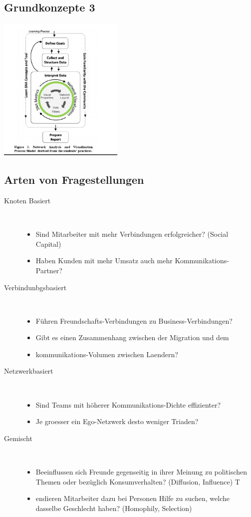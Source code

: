 \documentclass[a4paper,landscape,12pt]{scrreprt}
\newcommand{\dsp}{
\hfill \\
}
\begin{document}
\begin{multicols*}{2}
\chapter{Grundkonzepte 3} %
\label{cha:grundkonzepte_3}
\includegraphics[width=6cm]{./img/mmsna.png}
\section{Arten von Fragestellungen} %
\label{sec:arten_von_fragestellungen}
\begin{description}
	\item[Knoten Basiert] \dsp
	\begin{itemize}
	 	\item  Sind Mitarbeiter mit mehr Verbindungen erfolgreicher? (Social Capital)
 \item Haben Kunden mit mehr Umsatz auch mehr Kommunikations-Partner?

	 \end{itemize} 
	 \item[Verbindunbgsbasiert] \dsp
	 \begin{itemize}
	 	\item  Führen Freundschafts-Verbindungen zu Business-Verbindungen?
\item  Gibt es einen Zusammenhang zwischen der Migration und dem
\item kommunikations-Volumen zwischen Laendern?
	 \end{itemize}
	 \item[Netzwerkbasiert] \dsp
	 \begin{itemize}
	 	\item Sind Teams mit höherer Kommunikations-Dichte effizienter?
\item Je groesser ein Ego-Netzwerk desto weniger Triaden?
	 \end{itemize}
	 \item[Gemischt] \dsp
	 \begin{itemize}
	 	\item  Beeinflussen sich Freunde gegenseitig in ihrer Meinung zu politischen Themen oder bezüglich Konsumverhalten? (Diffusion, Influence)
 T\item endieren Mitarbeiter dazu bei Personen Hilfe zu suchen, welche
dasselbe Geschlecht haben? (Homophily, Selection)


\end{itemize}
\end{description}
\end{multicols*}
\end{document}
